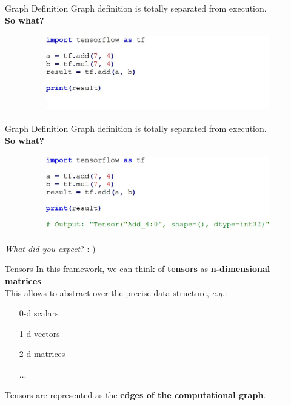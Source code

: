 \documentclass[aspectratio=169]{beamer}
\begin{document}
\begin{frame}{Graph Definition}
Graph definition is totally separated from execution.\\
\textbf{So what?}
\begin{figure}
\begin{tabular}{c}
	\includegraphics[width=0.9\textwidth]{img/tf/graph_definition_0.jpg}
\end{tabular}
\end{figure}
\end{frame}


\begin{frame}{Graph Definition}
Graph definition is totally separated from execution.\\
\textbf{So what?}
\begin{figure}
\begin{tabular}{c}
	\includegraphics[width=0.9\textwidth]{img/tf/graph_definition_1.jpg}
\end{tabular}
\end{figure}
\textit{What did you expect}? :-)
\end{frame}


\begin{frame}{Tensors}
In this framework, we can think of \textbf{tensors} as \textbf{n-dimensional matrices}.\\
\vspace{0.25cm}
This allows to abstract over the precise data structure, \textit{e.g.}:
\begin{itemize}
\item[0-d] scalars
\item[1-d] vectors
\item[2-d] matrices
\item[] $\dots$
\end{itemize}
Tensors are represented as the \textbf{edges of the computational graph}.
\end{frame}
\end{document}
